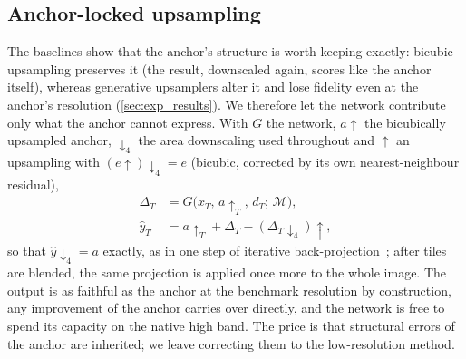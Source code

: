 \subsection{Anchor-locked upsampling}
\label{sec:lock}
The baselines show that the anchor's structure is worth keeping exactly: bicubic upsampling preserves
it (the result, downscaled again, scores like the anchor itself), whereas generative upsamplers alter
it and lose fidelity even at the anchor's resolution (\cref{sec:exp_results}). We therefore let the
network contribute only what the anchor cannot express. With $G$ the network, $a{\uparrow}$ the
bicubically upsampled anchor, ${\downarrow_4}$ the area downscaling used throughout and ${\uparrow}$ an
upsampling with $(e{\uparrow}){\downarrow_4} = e$ (bicubic, corrected by its own nearest-neighbour residual),
\begin{equation}
  \begin{aligned}
    \Delta_T &= G\big(x_T,\, a{\uparrow}_T,\, d_T;\, \mathcal{M}\big),\\
    \hat{y}_T &= a{\uparrow}_T + \Delta_T - (\Delta_T{\downarrow_4}){\uparrow},
  \end{aligned}
  \label{eq:output}
\end{equation}
so that $\hat{y}{\downarrow_4} = a$ exactly, as in one step of iterative
back-projection~\cite{irani1991backprojection}; after tiles are blended, the same projection is applied once more
to the whole image. The output is as faithful as the anchor at the
benchmark resolution by construction, any improvement of the anchor carries over directly, and the
network is free to spend its capacity on the native high band. The price is that structural errors of
the anchor are inherited; we leave correcting them to the low-resolution method.

